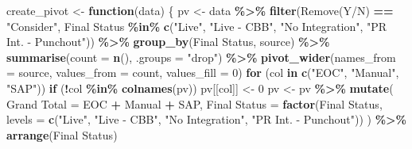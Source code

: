 \documentclass[
]{article}
\newenvironment{Shaded}{\begin{snugshade}}{\end{snugshade}}
\newcommand{\AttributeTok}[1]{\textcolor[rgb]{0.13,0.29,0.53}{#1}}
\newcommand{\ControlFlowTok}[1]{\textcolor[rgb]{0.13,0.29,0.53}{\textbf{#1}}}
\newcommand{\DecValTok}[1]{\textcolor[rgb]{0.00,0.00,0.81}{#1}}
\newcommand{\FunctionTok}[1]{\textcolor[rgb]{0.13,0.29,0.53}{\textbf{#1}}}
\newcommand{\NormalTok}[1]{#1}
\newcommand{\OtherTok}[1]{\textcolor[rgb]{0.56,0.35,0.01}{#1}}
\newcommand{\SpecialCharTok}[1]{\textcolor[rgb]{0.81,0.36,0.00}{\textbf{#1}}}
\newcommand{\StringTok}[1]{\textcolor[rgb]{0.31,0.60,0.02}{#1}}
\begin{document}
\begin{Shaded}
\begin{Highlighting}[]
\NormalTok{create\_pivot }\OtherTok{\textless{}{-}} \ControlFlowTok{function}\NormalTok{(data) \{}
\NormalTok{  pv }\OtherTok{\textless{}{-}}\NormalTok{ data }\SpecialCharTok{\%\textgreater{}\%}
    \FunctionTok{filter}\NormalTok{(}\StringTok{\textasciigrave{}}\AttributeTok{Remove(Y/N)}\StringTok{\textasciigrave{}} \SpecialCharTok{==} \StringTok{"Consider"}\NormalTok{,}
           \StringTok{\textasciigrave{}}\AttributeTok{Final Status}\StringTok{\textasciigrave{}} \SpecialCharTok{\%in\%} \FunctionTok{c}\NormalTok{(}\StringTok{"Live"}\NormalTok{, }\StringTok{"Live {-} CBB"}\NormalTok{, }\StringTok{"No Integration"}\NormalTok{, }\StringTok{"PR Int. {-} Punchout"}\NormalTok{)) }\SpecialCharTok{\%\textgreater{}\%}
    \FunctionTok{group\_by}\NormalTok{(}\StringTok{\textasciigrave{}}\AttributeTok{Final Status}\StringTok{\textasciigrave{}}\NormalTok{, source) }\SpecialCharTok{\%\textgreater{}\%}
    \FunctionTok{summarise}\NormalTok{(}\AttributeTok{count =} \FunctionTok{n}\NormalTok{(), }\AttributeTok{.groups =} \StringTok{"drop"}\NormalTok{) }\SpecialCharTok{\%\textgreater{}\%}
    \FunctionTok{pivot\_wider}\NormalTok{(}\AttributeTok{names\_from =}\NormalTok{ source, }\AttributeTok{values\_from =}\NormalTok{ count, }\AttributeTok{values\_fill =} \DecValTok{0}\NormalTok{)}
  \ControlFlowTok{for}\NormalTok{ (col }\ControlFlowTok{in} \FunctionTok{c}\NormalTok{(}\StringTok{"EOC"}\NormalTok{, }\StringTok{"Manual"}\NormalTok{, }\StringTok{"SAP"}\NormalTok{))}
    \ControlFlowTok{if}\NormalTok{ (}\SpecialCharTok{!}\NormalTok{col }\SpecialCharTok{\%in\%} \FunctionTok{colnames}\NormalTok{(pv)) pv[[col]] }\OtherTok{\textless{}{-}} \DecValTok{0}
\NormalTok{  pv }\OtherTok{\textless{}{-}}\NormalTok{ pv }\SpecialCharTok{\%\textgreater{}\%}
    \FunctionTok{mutate}\NormalTok{(}
      \StringTok{\textasciigrave{}}\AttributeTok{Grand Total}\StringTok{\textasciigrave{}} \OtherTok{=}\NormalTok{ EOC }\SpecialCharTok{+}\NormalTok{ Manual }\SpecialCharTok{+}\NormalTok{ SAP,}
      \StringTok{\textasciigrave{}}\AttributeTok{Final Status}\StringTok{\textasciigrave{}} \OtherTok{=} \FunctionTok{factor}\NormalTok{(}\StringTok{\textasciigrave{}}\AttributeTok{Final Status}\StringTok{\textasciigrave{}}\NormalTok{,}
                              \AttributeTok{levels =} \FunctionTok{c}\NormalTok{(}\StringTok{"Live"}\NormalTok{, }\StringTok{"Live {-} CBB"}\NormalTok{, }\StringTok{"No Integration"}\NormalTok{, }\StringTok{"PR Int. {-} Punchout"}\NormalTok{))}
\NormalTok{    ) }\SpecialCharTok{\%\textgreater{}\%}
    \FunctionTok{arrange}\NormalTok{(}\StringTok{\textasciigrave{}}\AttributeTok{Final Status}\StringTok{\textasciigrave{}}\NormalTok{)}

\end{Highlighting}
\end{Shaded}
\end{document}
